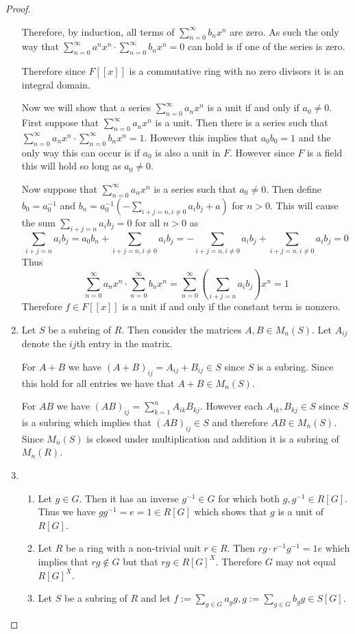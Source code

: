 \documentclass[10pt]{article}
\theoremstyle{plain}
\theoremstyle{remark}
\begin{document}
\begin{proof}
\begin{enumerate}
    Therefore, by induction, all terms of $\sum_{n=0}^\infty b_nx^n$ are zero. As such
    the only way that $\sum_{n=0}^\infty a^nx^n\cdot\sum_{n=0}^\infty b_nx^n=0$ can hold is if one of
    the series is zero.

    Therefore since $F[[x]]$ is a commutative ring with no zero divisors it is
    an integral domain.

    Now we will show that a series $\sum_{n=0}^\infty a_nx^n$ is a unit if and only if
    $a_0\neq 0$. First suppose that $\sum_{n=0}^\infty a_nx^n$ is a unit. Then there
    is a series such that $\sum_{n=0}^\infty a_nx^n\cdot\sum_{n=0}^\infty b_nx^n=1$. However this
    implies that $a_0b_0=1$ and the only way this can occur is if $a_0$ is also
    a unit in $F$. However since $F$ is a field this will hold so long as $a_0\neq 0$.

    Now suppose that $\sum_{n=0}^\infty a_nx^n$ is a series such that $a_0\neq 0$. Then define
    $b_0=a_0^{-1}$ and $b_n=a_0^{-1}(-\sum_{i+j=n,i\neq 0}a_ib_j+a)$ for $n>0$. This will
    cause the sum $\sum_{i+j=n}a_ib_j=0$ for all $n>0$ as
    \[ \sum_{i+j=n}a_ib_j=a_0b_n+\sum_{i+j=n,i\neq 0}a_ib_j=-\sum_{i+j=n,i\neq 0}a_ib_j+\sum_{i+j=n,i\neq 0}a_ib_j=0\]
    Thus
    \[ \sum_{n=0}^\infty a_nx^n\cdot \sum_{n=0}^\infty b_nx^n=\sum_{n=0}^\infty\left(\sum_{i+j=n}a_ib_j\right)x^n =1\]
    Therefore $f\in F[[x]]$ is a unit if and only if the constant term is nonzero.
  \item Let $S$ be a subring of $R$. Then consider the matrices
    $A,B\in M_n(S)$. Let $A_{ij}$ denote the $ij$th entry in the
    matrix.
    
    For $A+B$ we have $(A+B)_{ij}=A_{ij}+B_{ij}\in S$ since $S$
    is a subring. Since this hold for all entries we have
    that $A+B\in M_n(S)$.

    For $AB$ we have $(AB)_{ij}=\sum_{k=1}^n A_{ik}B_{kj}$.
    However each $A_{ik},B_{kj}\in S$ since $S$ is a subring
    which implies that $(AB)_{ij}\in S$ and therefore $AB\in M_n(S)$.
    Since $M_n(S)$ is closed under multiplication and addition
    it is a subring of $M_n(R)$.
  \item
    \begin{enumerate}
    \item Let $g\in G$. Then it has an inverse $g^{-1}\in G$
      for which both $g,g^{-1}\in R[G]$. Thus we have
      $gg^{-1}=e=1\in R[G]$ which shows that $g$ is a unit of $R[G]$.
    \item Let $R$ be a ring with a non-trivial unit $r\in R$. Then
      $rg\cdot r^{-1}g^{-1}=1e$ which implies that $rg\notin G$ but that
      $rg\in R[G]^X$. Therefore $G$  may not equal $R[G]^X$.
    \item Let $S$ be a subring of $R$ and let $f:=\sum_{g\in G}a_gg,g:=\sum_{g\in G}b_gg\in S[G]$.


\end{enumerate}
\end{enumerate}
\end{proof}
\end{document}

